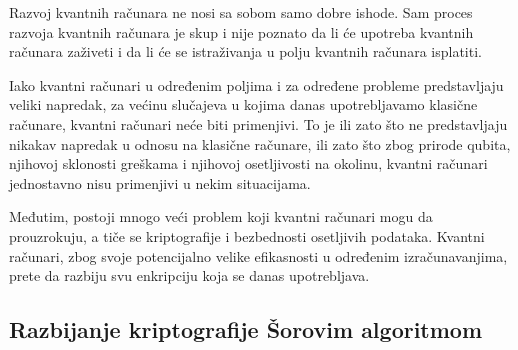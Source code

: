 \documentclass[fleqn, 12pt]{article}
\begin{document}
\begin{text}
Razvoj kvantnih računara ne nosi sa sobom samo dobre ishode. Sam proces razvoja kvantnih računara je skup i nije poznato da li će upotreba kvantnih računara zaživeti i da li će se istraživanja u polju kvantnih računara isplatiti.

Iako kvantni računari u određenim poljima i za određene probleme predstavljaju veliki napredak, za većinu slučajeva u kojima danas upotrebljavamo klasične računare, kvantni računari neće biti primenjivi. To je ili zato što ne predstavljaju nikakav napredak u odnosu na klasične računare, ili zato što zbog prirode qubita, njihovoj sklonosti greškama i njihovoj osetljivosti na okolinu, kvantni računari jednostavno nisu primenjivi u nekim situacijama.

Međutim, postoji mnogo veći problem koji kvantni računari mogu da prouzrokuju, a tiče se kriptografije i bezbednosti osetljivih podataka. Kvantni računari, zbog svoje potencijalno velike efikasnosti u određenim izračunavanjima, prete da razbiju svu enkripciju koja se danas upotrebljava.
\end{text}

\subsection{Razbijanje kriptografije Šorovim algoritmom}
\end{document}
